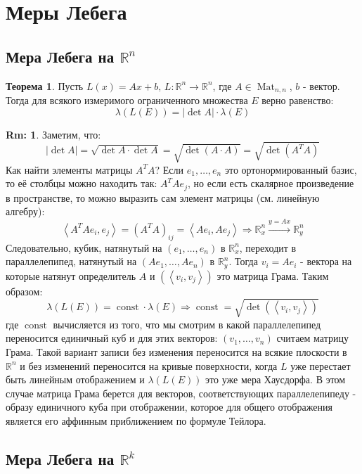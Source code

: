 \documentclass[12pt]{article}
\newcommand{\RN}[1]{%
	\textup{\uppercase\expandafter{\romannumeral#1}}%
}
\newcommand{\MR}{\mathbb{R}}
\theoremstyle{definition}
\newtheorem{rem}{Rm:}
\newtheorem{theorem}{Теорема}
\DeclareMathOperator{\const}{\text{const}}
\newcommand{\inner}[2]{\left\langle #1, #2 \right\rangle }
\newcommand{\mat}[2]{\operatorname{Mat}_{#1, #2}}
\begin{document}
\lhead{Математический анализ - \RN{4}}
\section*{Меры Лебега}
\subsection*{Мера Лебега на $\MR^n$}

\begin{theorem}
	Пусть $L(x) = Ax + b, \, L \colon \MR^n \to \MR^n$, где $A \in \mat{n}{n}$, $b$ - вектор. Тогда для всякого измеримого ограниченного множества $E$ верно равенство:
	$$
		\lambda(L(E)) = |\det{A}|{\cdot}\lambda(E)
	$$
\end{theorem}
\begin{rem}
	Заметим, что: 
	$$
		|\det{A}| = \sqrt{\det{A}{\cdot}\det{A}} = \sqrt{\det{(A{\cdot}A)}} = \sqrt{\det{(A^TA)}} 
	$$ 
	Как найти элементы матрицы $A^TA$? Если $e_1, \dotsc, e_n$ это ортонормированный базис, то её столбцы можно находить так: $A^TAe_j$, но если есть скалярное произведение в пространстве, то можно выразить сам элемент матрицы (см. линейную алгебру):
	$$
		\inner{A^TAe_i}{e_j} = (A^TA)_{ij} = \inner{Ae_i}{Ae_j} \Rightarrow \MR^n_x \xrightarrow{y = Ax}\MR^n_y
	$$
	Следовательно, кубик, натянутый на $(e_1,\dotsc, e_n)$ в $\MR^n_x$, переходит в параллелепипед, натянутый на $(Ae_1, \dotsc, Ae_n)$ в $\MR_y^n$. Тогда $v_i = Ae_i$ - вектора на которые натянут определитель $A$ и $(\inner{v_i}{v_j})$ это матрица Грама. Таким образом:
	$$
		\lambda(L(E)) = \const{\cdot}\lambda(E) \Rightarrow \const = \sqrt{\det{(\inner{v_i}{v_j})}}
	$$
	где $\const$ вычисляется из того, что мы смотрим в какой параллелепипед переносится единичный куб и для этих векторов: $(v_1, \dotsc, v_n)$ считаем матрицу Грама. Такой вариант записи без изменения переносится на всякие плоскости в $\MR^n$ и без изменений переносится на кривые поверхности, когда $L$ уже перестает быть линейным отображением и $\lambda(L(E))$ это уже мера Хаусдорфа. В этом случае матрица Грама берется для векторов, соответствующих параллелепипеду - образу единичного куба при отображении, которое для общего отображения является его аффинным приближением по формуле Тейлора.
\end{rem}

\subsection*{Мера Лебега на $\MR^k$}
\end{document}

